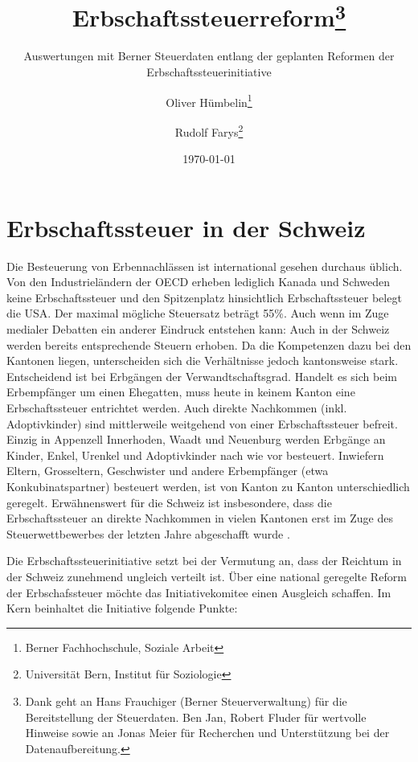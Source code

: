 \documentclass[a4paper, 12pt,liststotoc]{scrartcl}
\numberwithin{equation}{section}
\begin{document}
\title{Erbschaftssteuerreform\thanks{Dank geht an Hans Frauchiger (Berner
  Steuerverwaltung) für die Bereitstellung der Steuerdaten. Ben Jan,
  Robert Fluder für wertvolle Hinweise sowie an Jonas Meier für
  Recherchen und Unterstützung bei der Datenaufbereitung.}}
\subtitle{Auswertungen mit Berner Steuerdaten entlang der geplanten Reformen der
Erbschaftssteuerinitiative}
\author{Oliver Hümbelin\thanks{Berner Fachhochschule, Soziale Arbeit} \and Rudolf Farys\thanks{Universität Bern, Institut für Soziologie}}
\date{\today}
\maketitle
\newpage

\tableofcontents
\newpage
\listoffigures
\listoftables
\newpage

\section{Erbschaftssteuer in der
Schweiz}\label{erbschaftssteuer-in-der-schweiz}

Die Besteuerung von Erbennachlässen ist international gesehen durchaus
üblich. Von den Industrieländern der OECD erheben lediglich Kanada und
Schweden keine Erbschaftssteuer und den Spitzenplatz hinsichtlich
Erbschaftssteuer belegt die USA. Der maximal mögliche Steuersatz beträgt
55\%. Auch wenn im Zuge medialer Debatten ein anderer Eindruck entstehen
kann: Auch in der Schweiz werden bereits entsprechende Steuern erhoben.
Da die Kompetenzen dazu bei den Kantonen liegen, unterscheiden sich die
Verhältnisse jedoch kantonsweise stark. Entscheidend ist bei Erbgängen
der Verwandtschaftsgrad. Handelt es sich beim Erbempfänger um einen
Ehegatten, muss heute in keinem Kanton eine Erbschaftssteuer entrichtet
werden. Auch direkte Nachkommen (inkl. Adoptivkinder) sind mittlerweile
weitgehend von einer Erbschaftssteuer befreit. Einzig in Appenzell
Innerhoden, Waadt und Neuenburg werden Erbgänge an Kinder, Enkel,
Urenkel und Adoptivkinder nach wie vor besteuert. Inwiefern Eltern,
Grosseltern, Geschwister und andere Erbempfänger (etwa
Konkubinatspartner) besteuert werden, ist von Kanton zu Kanton
unterschiedlich geregelt. Erwähnenswert für die Schweiz ist
insbesondere, dass die Erbschaftssteuer an direkte Nachkommen in vielen
Kantonen erst im Zuge des Steuerwettbewerbes der letzten Jahre
abgeschafft wurde \parencite{estv2013}.

Die Erbschaftssteuerinitiative setzt bei der Vermutung an, dass der
Reichtum in der Schweiz zunehmend ungleich verteilt ist. Über eine
national geregelte Reform der Erbschafssteuer möchte das
Initiativekomitee einen Ausgleich schaffen. Im Kern beinhaltet die
Initiative folgende Punkte:
\end{document}
